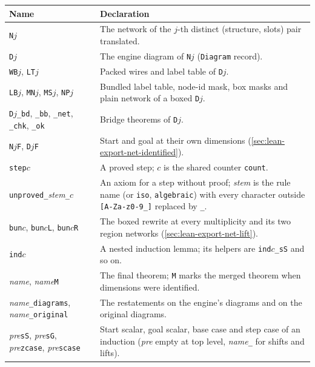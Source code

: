 {\begin{xltabular}{\linewidth}{@{}p{4.1cm}X@{}}
\toprule
Name & Declaration \\
\midrule
\texttt{N}$j$ & The network of the $j$-th distinct (structure, slots) pair translated. \\
\texttt{D}$j$ & The engine diagram of \texttt{N}$j$ (\texttt{Diagram} record). \\
\texttt{WB}$j$, \texttt{LT}$j$ & Packed wires and label table of \texttt{D}$j$. \\
\texttt{LB}$j$, \texttt{MN}$j$, \texttt{MS}$j$, \texttt{NP}$j$ & Bundled label table, node-id mask, box
  masks and plain network of a boxed \texttt{D}$j$. \\
\texttt{D}$j$\texttt{\_\allowbreak{}bd}, \texttt{\_\allowbreak{}bb}, \texttt{\_\allowbreak{}net}, \texttt{\_\allowbreak{}chk}, \texttt{\_\allowbreak{}ok} & Bridge theorems of
  \texttt{D}$j$. \\
\texttt{N}$j$\texttt{F}, \texttt{D}$j$\texttt{F} & Start and goal at their own dimensions
  (\cref{sec:lean-export-net-identified}). \\
\texttt{step}$c$ & A proved step; $c$ is the shared counter \texttt{count}. \\
\texttt{unproved\_\allowbreak{}}\textit{stem}\texttt{\_\allowbreak{}}$c$ & An axiom for a step without proof; \textit{stem} is
  the rule name (or \texttt{iso}, \texttt{algebraic}) with every character outside
  \texttt{[A-Za-z0-9\_\allowbreak{}]} replaced by \texttt{\_\allowbreak{}}. \\
\texttt{bun}$c$, \texttt{bun}$c$\texttt{L}, \texttt{bun}$c$\texttt{R} & The boxed rewrite at every
  multiplicity and its two region networks (\cref{sec:lean-export-net-lift}). \\
\texttt{ind}$c$ & A nested induction lemma; its helpers are \texttt{ind}$c$\texttt{\_\allowbreak{}sS} and so on. \\
\textit{name}, \textit{name}\texttt{M} & The final theorem; \texttt{M} marks the merged theorem when
  dimensions were identified. \\
\textit{name}\texttt{\_\allowbreak{}diagrams}, \textit{name}\texttt{\_\allowbreak{}original} & The restatements on the engine's
  diagrams and on the original diagrams. \\
\textit{pre}\texttt{sS}, \textit{pre}\texttt{sG}, \textit{pre}\texttt{zcase}, \textit{pre}\texttt{scase} &
  Start scalar, goal scalar, base case and step case of an induction (\textit{pre} empty at top
  level, \textit{name}\texttt{\_\allowbreak{}} for shifts and lifts). \\

\end{xltabular}}
